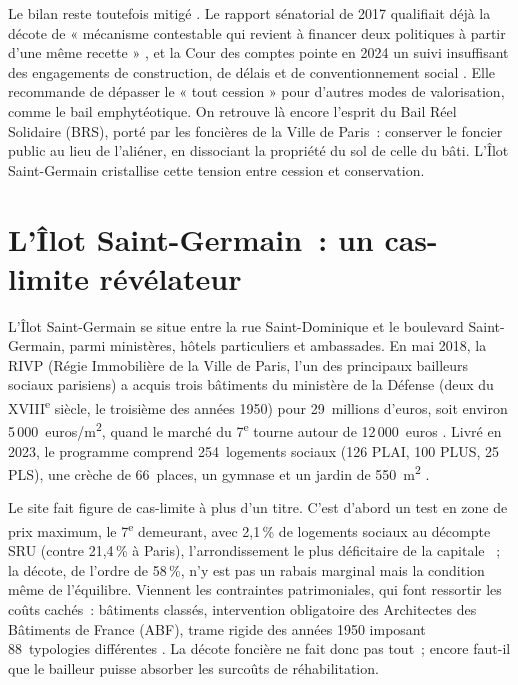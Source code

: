 \documentclass[a4paper,12pt]{article}
\begin{document}
Le bilan reste toutefois mitigé \parencite{BanqueDesTerritoires2024Decote}. Le rapport sénatorial de 2017 qualifiait déjà la décote de « mécanisme contestable qui revient à financer deux politiques à partir d'une même recette » \parencite{Senat2017ParcImmobilierArmees}, et la Cour des comptes pointe en 2024 un suivi insuffisant des engagements de construction, de délais et de conventionnement social \parencite{CourDesComptes2024CessionsMilitaires}. Elle recommande de dépasser le « tout cession » pour d'autres modes de valorisation, comme le bail emphytéotique. On retrouve là encore l'esprit du Bail Réel Solidaire (BRS), porté par les foncières de la Ville de Paris~: conserver le foncier public au lieu de l'aliéner, en dissociant la propriété du sol de celle du bâti. L'Îlot Saint-Germain cristallise cette tension entre cession et conservation.

\section{L'Îlot Saint-Germain~: un cas-limite révélateur}

L'Îlot Saint-Germain se situe entre la rue Saint-Dominique et le boulevard Saint-Germain, parmi ministères, hôtels particuliers et ambassades. En mai 2018, la RIVP (Régie Immobilière de la Ville de Paris, l'un des principaux bailleurs sociaux parisiens) a acquis trois bâtiments du ministère de la Défense (deux du XVIII\textsuperscript{e} siècle, le troisième des années 1950) pour 29~millions d'euros, soit environ 5\,000~euros/m\textsuperscript{2}, quand le marché du 7\textsuperscript{e} tourne autour de 12\,000~euros \parencite{BanqueDesTerritoires2018IlotSG}. Livré en 2023, le programme comprend 254~logements sociaux (126 PLAI, 100 PLUS, 25 PLS), une crèche de 66~places, un gymnase et un jardin de 550~m\textsuperscript{2} \parencite{FOPH2023IlotSG, VilleDeParis2023IlotSG}.

Le site fait figure de cas-limite à plus d'un titre. C'est d'abord un test en zone de prix maximum, le 7\textsuperscript{e} demeurant, avec 2,1\,\% de logements sociaux au décompte SRU (contre 21,4\,\% à Paris), l'arrondissement le plus déficitaire de la capitale \parencite{Ekopolis2025IlotSG}~; la décote, de l'ordre de 58\,\%, n'y est pas un rabais marginal mais la condition même de l'équilibre. Viennent les contraintes patrimoniales, qui font ressortir les coûts cachés~: bâtiments classés, intervention obligatoire des Architectes des Bâtiments de France (ABF), trame rigide des années 1950 imposant 88~typologies différentes \parencite{FOPH2023IlotSG}. La décote foncière ne fait donc pas tout~; encore faut-il que le bailleur puisse absorber les surcoûts de réhabilitation.
\end{document}
